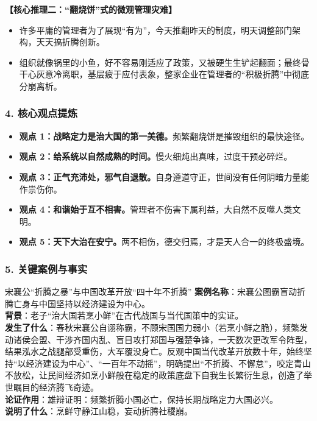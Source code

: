 \noindent\textbf{【核心推理二：“翻烧饼”式的微观管理灾难】}
\begin{itemize}
    \item 许多平庸的管理者为了展现“有为”，今天推翻昨天的制度，明天调整部门架构，天天搞折腾创新。
    \item 组织就像锅里的小鱼，好不容易刚适应了政策，又被硬生生铲起翻面；最终骨干心灰意冷离职，基层疲于应付表象，整家企业在管理者的“积极折腾”中彻底分崩离析。
\end{itemize}

\subsubsection{4. 核心观点提炼}
\begin{itemize}
    \item \textbf{观点 1：战略定力是治大国的第一美德。}频繁翻烧饼是摧毁组织的最快途径。
    \item \textbf{观点 2：给系统以自然成熟的时间。}慢火细炖出真味，过度干预必碎烂。
    \item \textbf{观点 3：正气充沛处，邪气自退散。}自身遵道守正，世间没有任何阴暗力量能作祟伤你。
    \item \textbf{观点 4：和谐始于互不相害。}管理者不伤害下属利益，大自然不反噬人类文明。
    \item \textbf{观点 5：天下大治在安宁。}两不相伤，德交归焉，才是天人合一的终极盛境。
\end{itemize}

\subsubsection{5. 关键案例与事实}
\begin{CaseBox}{宋襄公“折腾之暴”与中国改革开放“四十年不折腾”}
\textbf{案例名称}：宋襄公图霸盲动折腾亡身与中国坚持以经济建设为中心。\\
\textbf{背景}：老子“治大国若烹小鲜”在古代战国与当代国策中的实证。\\
\textbf{发生了什么}：春秋宋襄公自诩称霸，不顾宋国国力弱小（若烹小鲜之脆），频繁发动诸侯会盟、干涉齐国内乱、盲目攻打郑国与强楚争锋，一天数次更改军令阵型，结果泓水之战腿部受重伤，大军覆没身亡。反观中国当代改革开放数十年，始终坚持“以经济建设为中心”、“一百年不动摇”，明确提出“不折腾、不懈怠”，咬定青山不放松，让民间经济如烹小鲜般在稳定的政策底盘下自我生长繁衍生息，创造了举世瞩目的经济腾飞奇迹。\\
\textbf{论证作用}：雄辩证明：频繁折腾小国必亡，保持长期战略定力大国必兴。\\
\textbf{说明了什么}：烹鲜守静江山稳，妄动折腾社稷崩。
\end{CaseBox}

